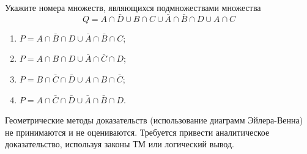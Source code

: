 \question
Укажите номера множеств, являющихся подмножествами множества
\begin{equation*}
	Q = A \cap \bar{D} \cup B \cap C \cup \bar{A} \cap \bar{B} \cap D \cup A \cap C
\end{equation*}

\begin{enumerate}
	\renewcommand{\labelenumi}{\arabic{enumi})}
	\item $P = A \cap \bar{B} \cap D \cup \bar{A} \cap \bar{B} \cap C$;
	\item $P = A \cap B \cap D \cup \bar{A} \cap \bar{C} \cap D$;
	\item $P = B \cap \bar{C} \cap \bar{D} \cup A \cap B \cap \bar{C}$;
	\item $P = A \cap \bar{C} \cap \bar{D} \cup \bar{A} \cap \bar{B} \cap D$.
\end{enumerate}

Геометрические методы доказательств (использование диаграмм Эйлера-Венна) не принимаются и не оцениваются. Требуется привести аналитическое доказательство, используя законы ТМ или логический вывод.
